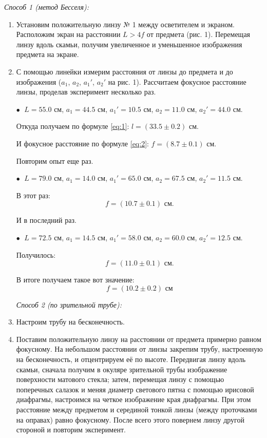 \documentclass[12pt,a4paper]{article}
\begin{document}
	\textit{Способ 1 (метод Бесселя):}
	\begin{enumerate}
		\item Установим положительную линзу № 1 между осветителем и экраном. Расположим экран на расстоянии $L > 4f$ от предмета (рис. 1). Перемещая линзу вдоль скамьи, получим увеличенное и уменьшенное изображения предмета на экране.
		
		\item С помощью линейки измерим расстояния от линзы до предмета и до изображения ($a_1$, $a_2$, $a_1'$, $a_2'$ на рис. 1). Рассчитаем фокусное расстояние линзы, проделав эксперимент несколько раз.
		
		$\bullet \;$ $L = 55.0$ см, $a_1 = 44.5$ см, $a_1' = 10.5$ см, $a_2 = 11.0$ см, $a_2' = 44.0$ см.
		
		Откуда получаем по формуле \ref{eq:1}: $l = (33.5 \pm 0.2)$ см.
		
		И фокусное расстояние по формуле \ref{eq:2}: $f = (8.7 \pm 0.1) \text{ см}.$
		
		Повторим опыт еще раз.
		
		$\bullet \;$ $L = 79.0$ см, $a_1 = 14.0$ см, $a_1' = 65.0$ см, $a_2 = 67.5$ см, $a_2' = 11.5$ см.
		
		В этот раз:
		\begin{equation*}
			f = (10.7 \pm 0.1) \text{ см}.
		\end{equation*}
	
		И в последний раз.
		
		$\bullet \;$ $L = 72.5$ см, $a_1 = 14.5$ см, $a_1' = 58.0$ см, $a_2 = 60.0$ см, $a_2' = 12.5$ см.
		
		Получилось:
		\begin{equation*}
			f = (11.0 \pm 0.1) \text{ см}.
		\end{equation*}
	
		В итоге получаем такое вот значение:
		\begin{equation*}
			\boxed{f = (10.2 \pm 0.2) \text{ см}}
		\end{equation*}
	
		\textit{Способ 2 (по зрительной трубе):}
		\item Настроим трубу на бесконечность.
		
		\item Поставим положительную линзу на расстоянии от предмета примерно равном фокусному. На небольшом расстоянии от линзы закрепим трубу, настроенную на бесконечность, и отцентрируем её по высоте. Передвигая линзу вдоль скамьи, сначала получим в окуляре зрительной трубы изображение поверхности матового стекла; затем, перемещая линзу с помощью поперечных салазок и меняя диаметр светового пятна с помощью ирисовой диафрагмы, настроимся на четкое изображение края диафрагмы. При этом расстояние между предметом и серединой тонкой линзы (между проточками на оправах) равно фокусному. После всего этого повернем линзу другой стороной и повторим эксперимент.
		

\end{enumerate}
\end{document}
